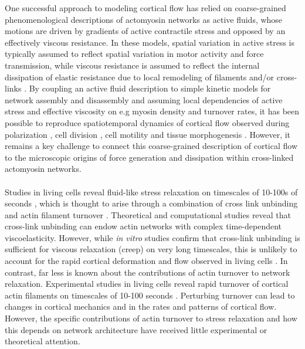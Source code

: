 \documentclass[10pt,letterpaper]{article}
\begin{document}
One successful approach to modeling cortical flow has relied on coarse-grained phenomenological descriptions of actomyosin networks as active fluids, whose motions are driven by gradients of active contractile stress and opposed by an effectively viscous resistance\cite{cellmech_flows}.  In these models, spatial variation in active stress is typically assumed to reflect spatial variation in motor activity and force transmission, while viscous resistance is assumed to reflect the internal dissipation of elastic resistance due to local remodeling of filaments and/or cross-links \cite{PhysRevLett.106.028103}. By coupling an active fluid description to simple kinetic models for network assembly and disassembly and assuming local dependencies of active stress and effective viscosity on e.g myosin density and turnover rates, it has been possible to reproduce spatiotemporal dynamics of cortical flow observed during polarization \cite{cellmech_flows}, cell division \cite{Turlier2014114,PhysRevLett.103.058102}, cell motility \cite{Keren:2009aa,RevModPhys.85.1143} and tissue morphogenesis \cite{Heisenberg2013948}. However, it remains a key challenge to connect this coarse-grained description of cortical flow to the microscopic origins of force generation and dissipation within cross-linked actomyosin networks.  

\paragraph{} Studies in living cells reveal fluid-like stress relaxation on timescales of 10-100s of seconds \cite{cellmech_flows,cellmech_flows2,cellmech_flows3,rheo_fluid,rheo_fluid2,cell_rheo_exp}, which is thought to arise through a combination of cross link unbinding and actin filament turnover \cite{De-La-Cruz:2015aa,De-La-Cruz:2009aa,Salbreux2012536}.  Theoretical \cite{theo_crosslinkslip1,theo_crosslinkslip2} and computational \cite{model_taeyoon,rheo_crosslinkslip2,theo_crosslinkslip3} studies reveal that cross-link unbinding can endow actin networks with complex time-dependent viscoelasticity. However, while {\em in vitro} studies confirm that cross-link unbinding is sufficient for viscous relaxation (creep) on very long timescales, this is unlikely to account for the rapid cortical deformation and flow observed in living cells \cite{rheo_crosslinksmatter,rheo_crosslinkslip1,rheo_crosslinkslip2,rheo_crosslinkslip3,rheo_nonaffine}.  In contrast, far less is known about the contributions of actin turnover to network relaxation. Experimental studies in living cells reveal rapid turnover of cortical actin filaments on timescales of 10-100 seconds \cite{Robin:2014a,Fritzsche:2013aa,Fritzschee1501337,Carlsson:2010aa,Lai:2008aa}.  Perturbing turnover can lead to changes in cortical mechanics and in the rates and patterns of cortical flow\cite{Van-Goor:2012aa,Fritzschee1501337}.  However, the specific contributions of actin turnover to stress relaxation and how this depends on network architecture have received little experimental or theoretical attention.   
\end{document}
